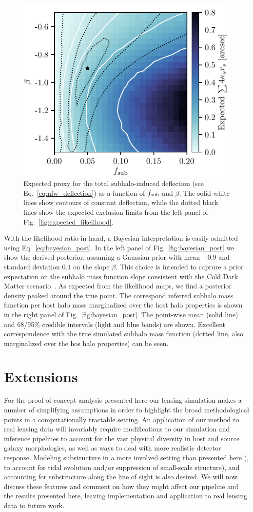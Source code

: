 \documentclass[twocolumn]{aastex62}
\begin{document}
\begin{figure}
\centering
\includegraphics[height=0.4\textwidth]{figures/warum_ist_die_banane_krumm}  %
\caption{Expected proxy for the total subhalo-induced deflection (see Eq.~\ref{eq:nfw_deflection}) as a function of $f_{\mathrm{sub}}$ and $\beta$. The solid white lines show contours of constant deflection, while the dotted black lines show the expected exclusion limits from the left panel of Fig.~\ref{fig:expected_likelihood}.}
\label{fig:banana}
\end{figure}

With the likelihood ratio in hand, a Bayesian interpretation is easily admitted using Eq.~\eqref{eq:bayesian_post}. In the left panel of Fig.~\ref{fig:bayesian_post} we show the derived posterior, assuming a Gaussian prior with mean $-0.9$ and standard deviation $0.1$ on the slope $\beta$. This choice is intended to capture a prior expectation on the subhalo mass function slope consistent with the Cold Dark Matter scenario~\citep{0809.0898,0802.2265}. As expected from the likelihood maps, we find a posterior density peaked around the true point. The correspond inferred subhalo mass function per host halo mass marginalized over the host halo properties is shown in the right panel of Fig.~\ref{fig:bayesian_post}. The point-wise mean (solid line) and 68/95\% credible intervals (light and blue bands) are shown. Excellent correspondence with the true simulated subhalo mass function (dotted line, also marginalized over the hos halo properties) can be seen.

\section{Extensions}
\label{sec:extensions}
%
For the proof-of-concept analysis presented here our lensing simulation makes a number of simplifying assumptions in order to highlight the broad methodological points in a computationally tractable setting. An application of our method to real lensing data will invariably require modifications to our simulation and inference pipelines to account for the vast physical diversity in host and source galaxy morphologies, as well as ways to deal with more realistic detector response. Modeling substructure in a more involved setting than presented here (\eg, to account for tidal evolution and/or suppression of small-scale structure), and accounting for substructure along the line of sight is also desired. We will now discuss these features and comment on how they might affect our pipeline and the results presented here, leaving implementation and application to real lensing data to future work.
\end{document}
